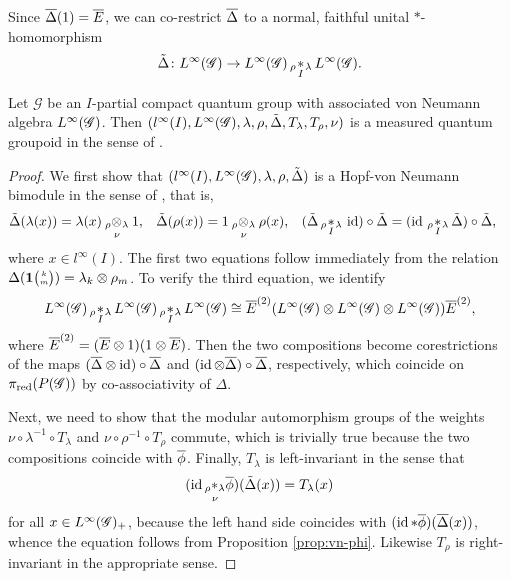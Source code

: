 Since $\overline{\Delta}(1)=\overline{E}$, we can co-restrict $\overline{\Delta}$ to  a
normal, faithful unital $*$-homomorphism
\begin{align*}
  \tilde\Delta \colon L^{\infty}(\mathscr{G}) \to   L^{\infty}(\mathscr{G}) \,{}_{\rho}\!\underset{I}{\ast}\,\!\!_{\lambda}\, L^{\infty}(\mathscr{G}).
\end{align*}
\begin{Theorem}
  Let $\mathscr{G}$ be an $I$-partial compact quantum group with
  associated von Neumann algebra $L^{\infty}(\mathscr{G})$.  Then
  $(l^{\infty}(I),L^{\infty}(\mathscr{G}), \lambda,\rho,\tilde\Delta,
  T_{\lambda},T_{\rho},\nu)$ is a measured quantum groupoid in the
  sense of \cite{Eno2}.
\end{Theorem}
\begin{proof}
We first show that  $(l^{\infty}(I),L^{\infty}(\mathscr{G}),
\lambda,\rho,\tilde\Delta)$ is  a Hopf-von
  Neumann bimodule in the sense of  \cite{Val1}, that is, 
  \begin{align*}
  \tilde\Delta(\lambda(x)) &= \lambda(x) \underset{\nu{}}{_{\rho}\otimes_{\lambda}} 1, &
  \tilde\Delta(\rho(x)) &= 1 \underset{\nu{}}{_{\rho}\otimes_{\lambda}} \rho(x), &
  (\tilde\Delta \,{}_{\rho}\!\underset{I}{\ast}\,\!\!_{\lambda}\, \operatorname{id})\circ \tilde\Delta &= (\operatorname{id} \,{}_{\rho}\!\underset{I}{\ast}\,\!\!_{\lambda}\,
    \tilde\Delta) \circ \tilde\Delta,
\end{align*}
where $x\in l^{\infty}(I)$.
The first two equations follow immediately from the relation
$\Delta(\mathbf{1}{\tiny {\begin{pmatrix} k\\m\end{pmatrix}}})=\lambda_{k} \otimes \rho_{m}$. To verify
the third equation, we identify
\begin{align*}
 L^{\infty}(\mathscr{G}) \,{}_{\rho}\!\underset{I}{\ast}\,\!\!_{\lambda}\, L^{\infty}(\mathscr{G}) \,{}_{\rho}\!\underset{I}{\ast}\,\!\!_{\lambda}\, L^{\infty}(\mathscr{G}) \cong \overline{E}^{(2)}(L^{\infty}(\mathscr{G})
  \otimes L^{\infty}(\mathscr{G}) \otimes L^{\infty}(\mathscr{G}))\overline{E}^{(2)},
\end{align*}
where $\overline{E}^{(2)}=(\overline{E} \otimes 1)(1 \otimes \overline{E})$. Then the two
compositions  become corestrictions of the maps $(\overline{\Delta} \otimes
\operatorname{id})\circ \overline{\Delta}$ and $(\operatorname{id} \otimes \overline{\Delta})\circ \overline{\Delta}$,
respectively, which coincide on $\pi_{\operatorname{\mathrm{red}}}(P(\mathscr{G}))$ by
co-associativity of $\Delta$. 

Next, we need to
show that the modular automorphism groups of the weights $\nu \circ
\lambda^{-1} \circ T_{\lambda}$ and $\nu \circ \rho^{-1} \circ
T_{\rho}$ commute, which is trivially true because the two
compositions coincide with $\overline{\phi}$. Finally,
$T_{\lambda}$ is left-invariant in the sense that
  \begin{align*}
   (\operatorname{id} \underset{\nu}{_{\rho}\ast_{\lambda}} \overline{\phi})(\tilde\Delta(x)) = T_{\lambda}(x) 
  \end{align*}
  for all $x\in L^{\infty}(\mathscr{G})_{+}$, because the left hand
  side coincides with $(\operatorname{id} \ast \overline{\phi})(\overline{\Delta}(x))$, whence the
  equation follows from Proposition
  \ref{prop:vn-phi}. Likewise $T_{\rho}$ is right-invariant in
  the appropriate sense. 
\end{proof}

